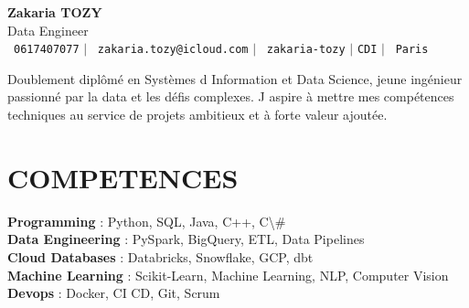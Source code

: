 \documentclass[letterpaper,11pt]{article}
\begin{document}
\begin{center}
    \textbf{\Huge Zakaria TOZY} \\ \vspace{3pt}
    \Large Data Engineer \\ \vspace{5pt}
    \small \faPhone\ \texttt{0617407077} \hspace{1pt} $|$
    \hspace{1pt} \faEnvelope\ \texttt{zakaria.tozy@icloud.com} \hspace{1pt} $|$
    \hspace{1pt} \faLinkedin\ \texttt{zakaria-tozy} \hspace{1pt} $|$
    \hspace{1pt} \texttt{CDI} \hspace{1pt} $|$
    \hspace{1pt} \faMapMarker\ \texttt{Paris}
    \\ \vspace{10pt}
\end{center}

\begin{itemize}[leftmargin=0in, label={}]
\small{\item{
Doublement dipl\^{o}m\'{e} en Syst\`{e}mes d Information et Data Science, jeune ing\'{e}nieur passionn\'{e} par la data et les d\'{e}fis complexes. J aspire \`{a} mettre mes comp\'{e}tences techniques au service de projets ambitieux et \`{a} forte valeur ajout\'{e}e.
}}
\end{itemize}

\section{COMPETENCES}
\begin{itemize}[leftmargin=0in, label={}]
\small{\item{
     \textbf{Programming} {: Python, SQL, Java, C++, C\textbackslash{}#}\vspace{2pt} \\
     \textbf{Data Engineering} {: PySpark, BigQuery, ETL, Data Pipelines}\vspace{2pt} \\
     \textbf{Cloud Databases} {: Databricks, Snowflake, GCP, dbt}\vspace{2pt} \\
     \textbf{Machine Learning} {: Scikit-Learn, Machine Learning, NLP, Computer Vision}\vspace{2pt} \\
     \textbf{Devops} {: Docker, CI CD, Git, Scrum}
}}
\end{itemize}
\end{document}
